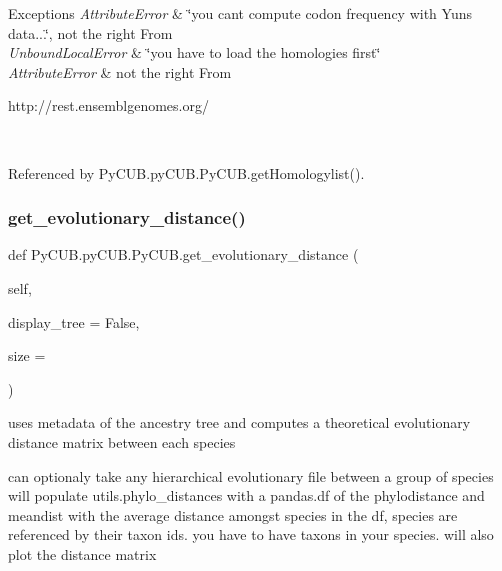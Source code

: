 \begin{DoxyExceptions}{Exceptions}
{\em Attribute\+Error} & \char`\"{}you can\textquotesingle{}t compute codon frequency with Yun\textquotesingle{}s data...\char`\"{}, \textquotesingle{}not the right From\textquotesingle{} \\
\hline
{\em Unbound\+Local\+Error} & \char`\"{}you have to load the homologies first\char`\"{} \\
\hline
{\em Attribute\+Error} & \textquotesingle{}not the right From\textquotesingle{} \begin{DoxyVerb}   http://rest.ensemblgenomes.org/\end{DoxyVerb}
 \\
\hline
\end{DoxyExceptions}


Referenced by Py\+C\+U\+B.\+py\+C\+U\+B.\+Py\+C\+U\+B.\+get\+Homologylist().

\mbox{\label{class_py_c_u_b_1_1py_c_u_b_1_1_py_c_u_b_af0d7bed125f4437bea6b8051f9922c1d}} 
\subsubsection{\texorpdfstring{get\+\_\+evolutionary\+\_\+distance()}{get\_evolutionary\_distance()}}
{\footnotesize\ttfamily def Py\+C\+U\+B.\+py\+C\+U\+B.\+Py\+C\+U\+B.\+get\+\_\+evolutionary\+\_\+distance (\begin{DoxyParamCaption}\item[{}]{self,  }\item[{}]{display\+\_\+tree = {\ttfamily False},  }\item[{}]{size = {} }\end{DoxyParamCaption})}



uses metadata of the ancestry tree and computes a theoretical evolutionary distance matrix between each species 

can optionaly take any hierarchical evolutionary file between a group of species will populate utils.\+phylo\+\_\+distances with a pandas.\+df of the phylodistance and meandist with the average distance amongst species in the df, species are referenced by their taxon ids. you have to have taxons in your species. will also plot the distance matrix


